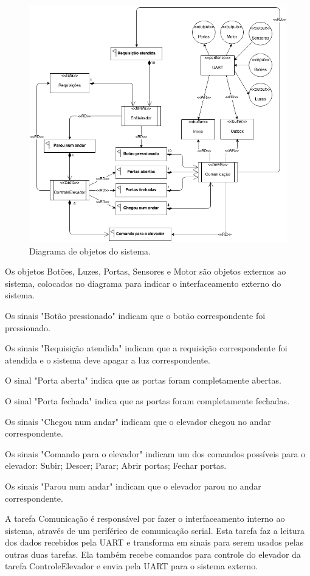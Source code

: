 \begin{figure}[h]
    \centering
    \includegraphics[width=0.8\columnwidth]{./figures/Objetos.png}
    \caption{Diagrama de objetos do sistema.}
    \label{fig:objetos}
\end{figure}

Os objetos Botões, Luzes, Portas, Sensores e Motor são objetos externos ao sistema, colocados no diagrama para indicar o interfaceamento externo do sistema.

Os sinais "Botão pressionado" indicam que o botão correspondente foi pressionado.

Os sinais "Requisição atendida" indicam que a requisição correspondente foi atendida e o sistema deve apagar a luz correspondente.

O sinal "Porta aberta" indica que as portas foram completamente abertas.

O sinal "Porta fechada" indica que as portas foram completamente fechadas.

Os sinais "Chegou num andar" indicam que o elevador chegou no andar correspondente.

Os sinais "Comando para o elevador" indicam um dos comandos possíveis para o elevador: Subir; Descer; Parar; Abrir portas; Fechar portas.

Os sinais "Parou num andar" indicam que o elevador parou no andar correspondente.

A tarefa Comunicação é responsável por fazer o interfaceamento interno ao sistema, através de um periférico de comunicação serial. Esta tarefa faz a leitura dos dados recebidos pela UART e transforma em sinais para serem usados pelas outras duas tarefas. Ela também recebe comandos para controle do elevador da tarefa ControleElevador e envia pela UART para o sistema externo.

